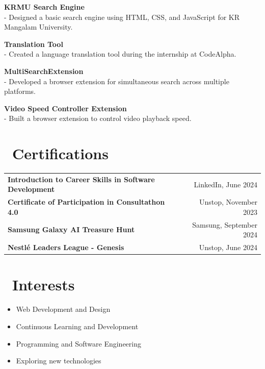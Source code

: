 \documentclass[a4paper,10pt]{article}
\begin{document}
\textbf{KRMU Search Engine} \\
- Designed a basic search engine using HTML, CSS, and JavaScript for KR Mangalam University.

\textbf{Translation Tool} \\
- Created a language translation tool during the internship at CodeAlpha.

\textbf{MultiSearchExtension} \\
- Developed a browser extension for simultaneous search across multiple platforms.

\textbf{Video Speed Controller Extension} \\
- Built a browser extension to control video playback speed.

\section*{\faCertificate\ Certifications}
\begin{tabularx}{\textwidth}{Xr}
    \textbf{Introduction to Career Skills in Software Development} & LinkedIn, June 2024 \\
    \textbf{Certificate of Participation in Consultathon 4.0} & Unstop, November 2023 \\
    \textbf{Samsung Galaxy AI Treasure Hunt} & Samsung, September 2024 \\
    \textbf{Nestlé Leaders League - Genesis} & Unstop, June 2024 \\
\end{tabularx}

\section*{\faHeart\ Interests}
\begin{itemize}[label=\faStar]
    \item Web Development and Design
    \item Continuous Learning and Development
    \item Programming and Software Engineering
    \item Exploring new technologies
\end{itemize}
\end{document}

